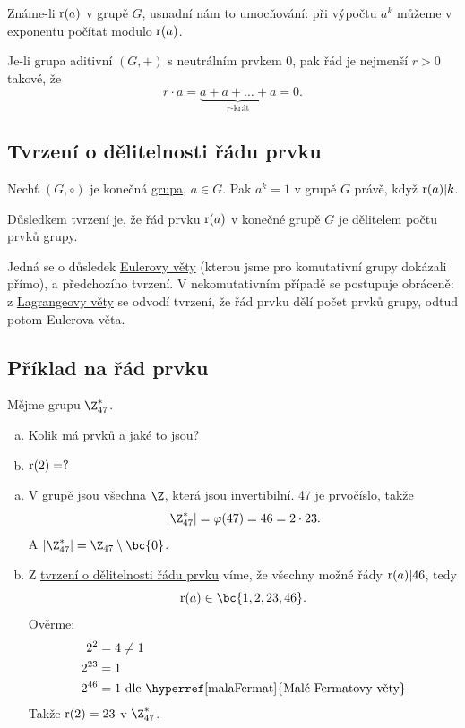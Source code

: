 Známe-li $\operatorname*{r}(a)$ v grupě $G$, usnadní nám to umocňování: při výpočtu $a^k$ můžeme v exponentu počítat modulo $\operatorname*{r}(a)$. 

Je-li grupa aditivní $(G, +)$ s neutrálním prvkem 0, pak řád je nejmenší $r>0$ takové, že
\begin{equation}
	r \cdot a = \underbrace{a + a + \dots + a}_{r\text{-krát}} = 0.
\end{equation}

\subsection{Tvrzení o dělitelnosti řádu prvku}\label{tvrDelRad}
Nechť $(G, \circ)$ je konečná \hyperref[grupa]{grupa}, $a \in G$. Pak $a^k = 1$ v grupě $G$ právě, když $\operatorname*{r}(a) |k$. 

Důsledkem tvrzení je, že řád prvku $\operatorname*{r}(a)$ v konečné grupě $G$ je dělitelem počtu prvků grupy.

Jedná se o důsledek \hyperref[euler]{Eulerovy věty} (kterou jsme pro komutativní grupy dokázali přímo), a předchozího tvrzení. V nekomutativním případě se postupuje obráceně: z \hyperref[lagrange]{Lagrangeovy věty} se odvodí tvrzení, že řád prvku dělí počet prvků grupy, odtud potom Eulerova věta.

\subsection{Příklad na řád prvku}
Mějme grupu $\Z_{47}^*$.
\begin{enumerate}[a)]
	\item Kolik má prvků a jaké to jsou?
	\item $\operatorname*{r}(2) = ?$ 
\end{enumerate}
\begin{enumerate}[a)]
	\item V grupě jsou všechna $\Z$, která jsou invertibilní. 47 je prvočíslo, takže
	\begin{equation}
		| \Z_{47}^* | = \varphi(47) = 46 = 2 \cdot 23.
	\end{equation}
	A $|\Z_{47}^* | = \Z_{47} \setminus \bc{0}$.
	\item Z \hyperref[tvrDelRad]{tvrzení o dělitelnosti řádu prvku} víme, že všechny možné řády $\operatorname*{r}(a) | 46$, tedy
	\begin{equation}
		\ra(a) \in \bc{1, 2, 23, 46}.
	\end{equation}
	Ověrme:
	\begin{align}
		2^2 &= 4 \not= 1 \\
		2^{23} &= 1\\
		2^{46} &= 1 \text{ dle \hyperref[malaFermat]{Malé Fermatovy věty}}
	\end{align}
	Takže $\operatorname*{r}(2) = 23$ v $\Z_{47}^*$.
\end{enumerate}


